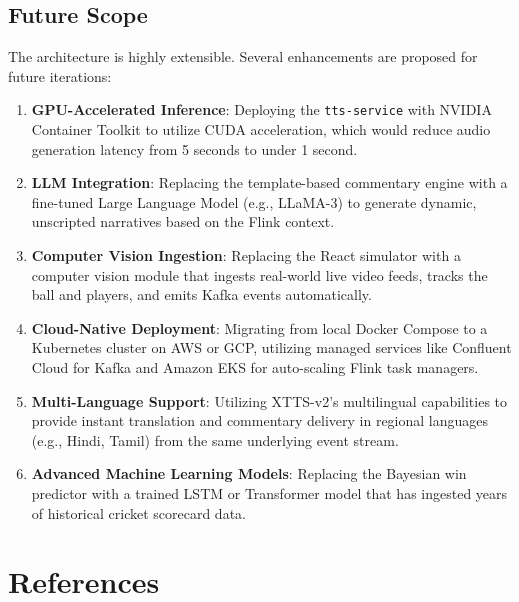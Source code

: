 \documentclass[12pt,a4paper]{article}
\begin{document}
\subsection{Future Scope}

The architecture is highly extensible. Several enhancements are proposed for future iterations:

\begin{enumerate}
\item \textbf{GPU-Accelerated Inference}: Deploying the \texttt{tts-service} with NVIDIA Container Toolkit to utilize CUDA acceleration, which would reduce audio generation latency from 5 seconds to under 1 second.
\item \textbf{LLM Integration}: Replacing the template-based commentary engine with a fine-tuned Large Language Model (e.g., LLaMA-3) to generate dynamic, unscripted narratives based on the Flink context.
\item \textbf{Computer Vision Ingestion}: Replacing the React simulator with a computer vision module that ingests real-world live video feeds, tracks the ball and players, and emits Kafka events automatically.
\item \textbf{Cloud-Native Deployment}: Migrating from local Docker Compose to a Kubernetes cluster on AWS or GCP, utilizing managed services like Confluent Cloud for Kafka and Amazon EKS for auto-scaling Flink task managers.
\item \textbf{Multi-Language Support}: Utilizing XTTS-v2's multilingual capabilities to provide instant translation and commentary delivery in regional languages (e.g., Hindi, Tamil) from the same underlying event stream.
\item \textbf{Advanced Machine Learning Models}: Replacing the Bayesian win predictor with a trained LSTM or Transformer model that has ingested years of historical cricket scorecard data.
\end{enumerate}


\newpage

\section*{References}
\end{document}
